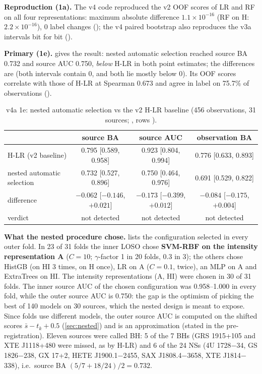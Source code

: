 \textbf{Reproduction (1a).} The v4 code reproduced the v2 OOF scores of LR and RF on all four representations: maximum
absolute difference $1.1\times10^{-16}$ (RF on H: $2.2\times10^{-16}$), 0 label changes
(); the v4 paired bootstrap also reproduces the v3a intervals bit for bit
().

\textbf{Primary (1e).} \Primary{}  gives the result: nested automatic selection reached source BA
0.732 and source AUC 0.750, \emph{below} H-LR in both point estimates; the differences are \NotDetected{} (both intervals
contain 0, and both lie mostly below 0). Its OOF scores correlate with those of H-LR at Spearman 0.673 and agree in
label on 75.7\% of observations ().

\begin{table}[htbp]
\centering\small
\caption[v4a primary result]{\Primary{} v4a 1e: nested automatic selection vs the v2 H-LR baseline (456 observations, 31
sources; , rows ).}
\label{tab:p2primary}
\footnotesize\setlength{\tabcolsep}{4pt}
\begin{tabular}{@{}lccc@{}}
\toprule
 & source BA & source AUC & observation BA \\
\midrule
H-LR (v2 baseline) & 0.795 [0.589, 0.958] & 0.923 [0.804, 0.994] & 0.776 [0.633, 0.893] \\
nested automatic selection & 0.732 [0.527, 0.896] & 0.750 [0.464, 0.976] & 0.691 [0.529, 0.822] \\
difference & $-0.062$ [$-0.146$, $+0.021$] & $-0.173$ [$-0.399$, $+0.012$] & $-0.084$ [$-0.175$, $+0.004$] \\
verdict & not detected & not detected & not detected \\
\bottomrule
\end{tabular}
\end{table}

\textbf{What the nested procedure chose.}  lists the configuration selected in every outer fold. In 23
of 31 folds the inner LOSO chose \textbf{SVM-RBF on the intensity representation A} ($C=10$; $\gamma$-factor 1 in 20
folds, 0.3 in 3); the others chose HistGB (on HI 3 times, on H once), LR on A ($C=0.1$, twice), an MLP on A and ExtraTrees
on HI. The intensity representations (A, HI) were chosen in 30 of 31 folds. The inner source AUC of the chosen
configuration was 0.958--1.000 in every fold, while the outer source AUC is 0.750: the gap is the optimism of picking the
best of 140 models on 30 sources, which the nested design is meant to expose. Since folds use different models, the outer
source AUC is computed on the shifted scores $\bar s-t_k+0.5$ (\cref{sec:nested}) and is an approximation (stated in the
pre-registration). Eleven sources were called BH: 5 of the 7 BHs (GRS 1915+105 and XTE J1118+480 were missed, as by H-LR) and 6 of the
24 NSs (4U 1728$-$34, GS 1826$-$238, GX 17+2, HETE J1900.1$-$2455, SAX J1808.4$-$3658, XTE J1814$-$338), i.e.\ source BA
$(5/7+18/24)/2=0.732$.


